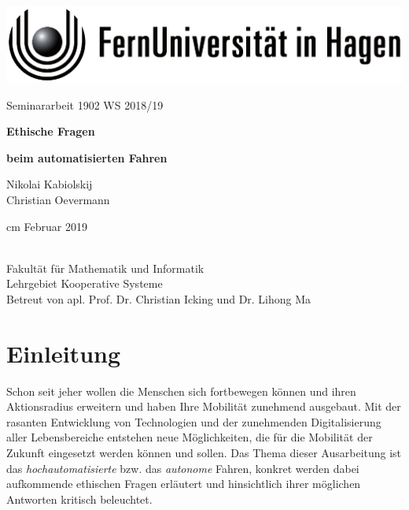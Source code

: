 \documentclass[twoside,a4paper,12pt]{article}
\begin{document}
\thispagestyle{empty}
\begin{center}
	\includegraphics[scale=1]{resources/fernunisignet-sw}
\end{center}
\vskip 4cm
\begin{center}
	{\Large Seminararbeit 1902 WS 2018/19\par}
	\vskip 2.5cm
	{\textbf{\Large Ethische Fragen} \par}    
	\vskip 0.2cm	
	{\textbf{\Large beim automatisierten Fahren} \par}    
	\vskip 1cm
	{\Large Nikolai Kabiolskij\\Christian Oevermann \par}
	 cm
	\Large Februar 2019
\end{center}
\FUiH\\
Fakultät für Mathematik und Informatik\\
Lehrgebiet Kooperative Systeme\\
Betreut von apl. Prof. Dr. Christian Icking und Dr. Lihong Ma\\
  
\newpage
\tableofcontents


\listoffigures
\newpage


\section{Einleitung} \label{Einleitung}
Schon seit jeher wollen die Menschen sich fortbewegen können und ihren Aktionsradius erweitern und haben Ihre Mobilität zunehmend ausgebaut. Mit der rasanten
Entwicklung von Technologien und der zunehmenden Digitalisierung aller Lebensbereiche entstehen neue Möglichkeiten, die für die Mobilität der Zukunft eingesetzt 
werden können und sollen. Das Thema dieser Ausarbeitung ist das \textit{hochautomatisierte} bzw. das \textit{autonome} Fahren, konkret werden dabei aufkommende
ethischen Fragen erläutert und hinsichtlich ihrer möglichen Antworten kritisch beleuchtet. 
\end{document}
